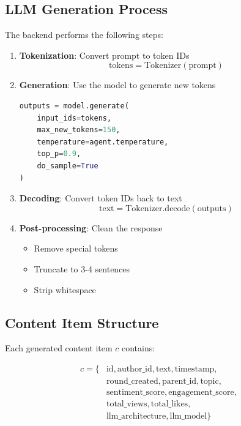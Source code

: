 \documentclass[11pt]{article}
\begin{document}
\subsection{LLM Generation Process}

The backend performs the following steps:

\begin{enumerate}
    \item \textbf{Tokenization}: Convert prompt to token IDs
    \begin{equation}
    \text{tokens} = \text{Tokenizer}(\text{prompt})
    \end{equation}

    \item \textbf{Generation}: Use the model to generate new tokens
    \begin{lstlisting}[language=Python, basicstyle=\small\ttfamily]
outputs = model.generate(
    input_ids=tokens,
    max_new_tokens=150,
    temperature=agent.temperature,
    top_p=0.9,
    do_sample=True
)
    \end{lstlisting}

    \item \textbf{Decoding}: Convert token IDs back to text
    \begin{equation}
    \text{text} = \text{Tokenizer.decode}(\text{outputs})
    \end{equation}

    \item \textbf{Post-processing}: Clean the response
    \begin{itemize}
        \item Remove special tokens
        \item Truncate to 3-4 sentences
        \item Strip whitespace
    \end{itemize}
\end{enumerate}

\subsection{Content Item Structure}

Each generated content item $c$ contains:

\begin{align}
c = \{&\text{id}, \text{author\_id}, \text{text}, \text{timestamp}, \\
      &\text{round\_created}, \text{parent\_id}, \text{topic}, \\
      &\text{sentiment\_score}, \text{engagement\_score}, \\
      &\text{total\_views}, \text{total\_likes}, \\
      &\text{llm\_architecture}, \text{llm\_model}\}
\end{align}
\end{document}
